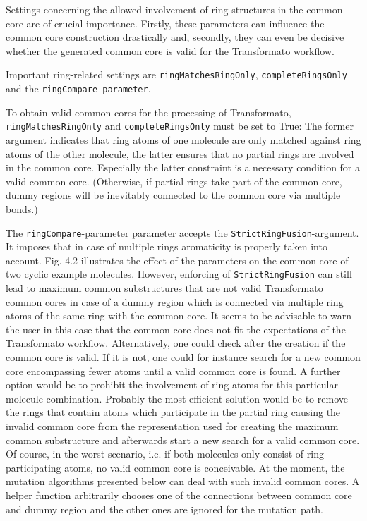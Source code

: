 Settings concerning the allowed involvement of ring structures in
the common core are of crucial importance. Firstly, these parameters
can influence the common core construction drastically and, secondly, they
can even be decisive whether the generated common core is valid for the
Transformato workflow.

Important ring-related settings are \texttt{ringMatchesRingOnly}, \texttt{completeRingsOnly}
and the \texttt{ringCompare-parameter}. 

To obtain valid common cores for the processing of Transformato, \texttt{ringMatchesRingOnly}
and \texttt{completeRingsOnly} must be set to True: The former argument indicates
that ring atoms of one molecule are only matched against ring atoms
of the other molecule, the latter ensures that no partial rings are
involved in the common core. Especially the latter constraint is a
necessary condition for a valid common core. (Otherwise, if partial
rings take part of the common core, dummy regions will be inevitably
connected to the common core via multiple bonds.)

The \texttt{ringCompare}-parameter parameter accepts the \texttt{StrictRingFusion}-argument.
It imposes that in case of multiple rings aromaticity is properly
taken into account. Fig. 4.2 illustrates the effect of the parameters
on the common core of two cyclic example molecules. However, enforcing
of \texttt{StrictRingFusion} can still lead to maximum common substructures
that are not valid Transformato common cores in case of a dummy region
which is connected via multiple ring atoms of the same ring with the common
core. It seems to be advisable to warn the user in this case that the common
core does not fit the expectations of the Transformato workflow. Alternatively,
one could check after the creation if the common core is valid. If
it is not, one could for instance search for a new common core encompassing fewer
atoms until a valid common core is found. A further option would be to prohibit the involvement of ring atoms for this particular molecule combination.
Probably the most efficient solution would be to remove the rings that contain atoms which participate in the partial ring causing the invalid common core from the representation used for creating the maximum common substructure and afterwards start a new search for a valid common core.
Of course,
in the worst scenario, i.e. if both molecules only consist of ring-participating
atoms, no valid common core is conceivable.
At the moment, the mutation algorithms presented below can deal with such invalid common cores. A helper function arbitrarily chooses one of the connections between common core and dummy region and the other ones are ignored for the mutation path.


